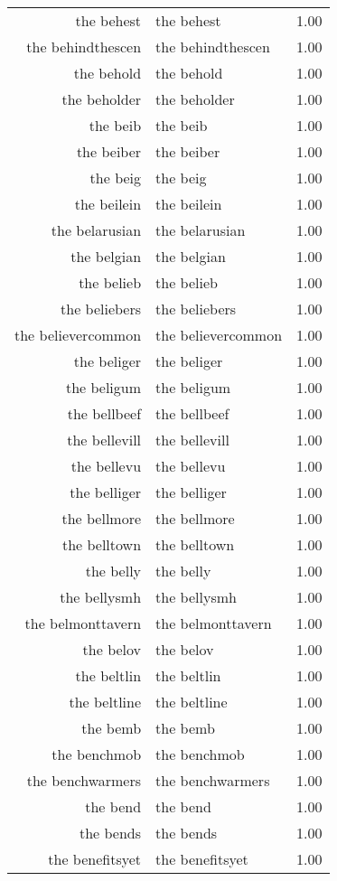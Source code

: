 \begin{table}[ht]
\begin{tabular}{rlr}
  the behest & the behest & 1.00 \\ 
  the behindthescen & the behindthescen & 1.00 \\ 
  the behold & the behold & 1.00 \\ 
  the beholder & the beholder & 1.00 \\ 
  the beib & the beib & 1.00 \\ 
  the beiber & the beiber & 1.00 \\ 
  the beig & the beig & 1.00 \\ 
  the beilein & the beilein & 1.00 \\ 
  the belarusian & the belarusian & 1.00 \\ 
  the belgian & the belgian & 1.00 \\ 
  the belieb & the belieb & 1.00 \\ 
  the beliebers & the beliebers & 1.00 \\ 
  the believercommon & the believercommon & 1.00 \\ 
  the beliger & the beliger & 1.00 \\ 
  the beligum & the beligum & 1.00 \\ 
  the bellbeef & the bellbeef & 1.00 \\ 
  the bellevill & the bellevill & 1.00 \\ 
  the bellevu & the bellevu & 1.00 \\ 
  the belliger & the belliger & 1.00 \\ 
  the bellmore & the bellmore & 1.00 \\ 
  the belltown & the belltown & 1.00 \\ 
  the belly & the belly & 1.00 \\ 
  the bellysmh & the bellysmh & 1.00 \\ 
  the belmonttavern & the belmonttavern & 1.00 \\ 
  the belov & the belov & 1.00 \\ 
  the beltlin & the beltlin & 1.00 \\ 
  the beltline & the beltline & 1.00 \\ 
  the bemb & the bemb & 1.00 \\ 
  the benchmob & the benchmob & 1.00 \\ 
  the benchwarmers & the benchwarmers & 1.00 \\ 
  the bend & the bend & 1.00 \\ 
  the bends & the bends & 1.00 \\ 
  the benefitsyet & the benefitsyet & 1.00 \\ 

\end{tabular}
\end{table}
